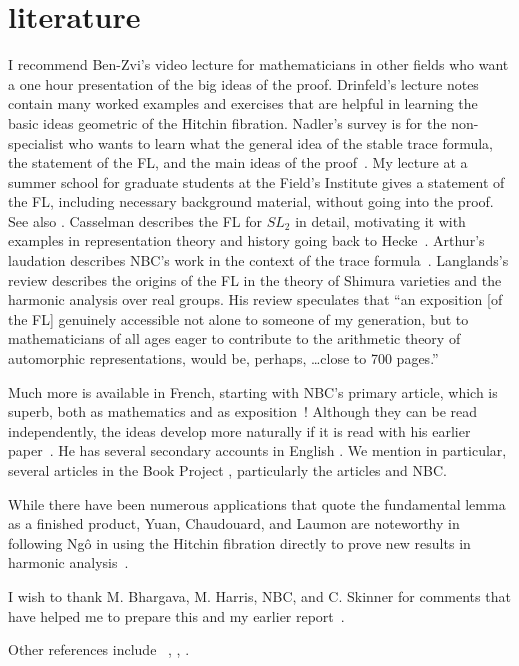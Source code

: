 \documentclass[brochure,english,12pt]{bourbaki}
\begin{document}
\section{literature}

I recommend Ben-Zvi's video lecture for mathematicians in other fields who
want a one hour presentation of the big ideas of the proof.
Drinfeld's lecture notes contain many worked examples and exercises
that are helpful in learning the basic ideas geometric of the Hitchin
fibration.  Nadler's survey is for the non-specialist who wants to
learn what the general idea of the stable trace formula, the statement
of the FL, and the main ideas of the proof~\cite{Nadler:2010}.  My lecture
at a summer school for graduate students at the Field's Institute
gives a statement of the FL, including necessary
background material, without going into the proof.  See also
\cite{XX}. %
Casselman describes the FL for $SL_2$ in
detail, motivating it with examples in representation theory and
history going back to Hecke~\cite{Cass:2010}.  Arthur's laudation describes NBC's work
in the context of the trace formula~\cite{Arthur:2010}.  Langlands's review describes the
origins of the FL in the theory of Shimura varieties
and the harmonic analysis over real groups.  His review speculates
that ``an exposition [of the FL] genuinely accessible
not alone to someone of my generation, but to mathematicians of all
ages eager to contribute to the arithmetic theory of automorphic
representations, would be, perhaps, \ldots close to 700 pages.''


Much more is available in French, starting with NBC's primary article,
which is superb, both as mathematics and as exposition~\cite{NBC:2010}!  Although they
can be read independently, the ideas develop more naturally if it is
read with his earlier paper~\cite{NBC:2006}.  He has several secondary accounts in
English \cite{XX}.  We mention in particular, several articles in the
Book Project \cite{XX}, particularly the articles \cite{DN:2010}
and NBC.


While there have been numerous applications that quote the fundamental
lemma as a finished product, Yuan, Chaudouard, and Laumon are
noteworthy in following Ng\^o in using the Hitchin fibration directly to
prove new results in harmonic analysis~\cite{XX}.


I wish to thank M. Bhargava, M. Harris, NBC, and C. Skinner for comments that
have helped me to prepare this and my earlier report~\cite{XX}.

Other references include
~\cite{CHLaumon:2010}, \cite{Wald:1991}, \cite{Hitchin:87}.

\raggedright

\end{document}
